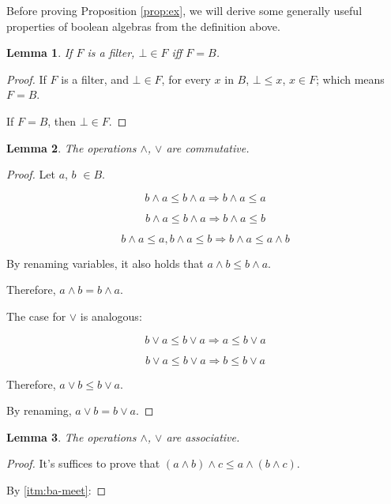 \documentclass[notitlepage,a4paper]{article}
\newtheorem{lemma}{Lemma}
\begin{document}
\begin{enumerate}
    Before proving Proposition \ref{prop:ex}, we will derive
    some generally useful properties of boolean algebras from the definition above.
    
     \begin{lemma}\label{lem:bot}
       If $F$ is a filter, $⊥ \in F$ iff $F = B$.
     \end{lemma}
     
     \begin{proof}
           If $F$ is a filter, and $⊥ ∈ F$, for every $x$ in $B$, $⊥ ≤ x$,
           $x ∈ F$; which means $F = B$.

           If $F = B$, then $⊥ \in F$.
     \end{proof}

      \begin{lemma}\label{lem:commutative}
       The operations $∧$, $∨$ are commutative.
     \end{lemma}

     \begin{proof}
       Let $a$, $b$ $∈ B$.
       
       $$b ∧ a ≤ b ∧ a \Rightarrow b ∧ a ≤ a$$

       $$b ∧ a ≤ b ∧ a \Rightarrow b ∧ a ≤ b$$
       
       $$b ∧ a ≤ a, b ∧ a ≤ b \Rightarrow b ∧ a ≤ a ∧ b$$

       By renaming variables,  it also holds that $a ∧ b ≤ b ∧ a$.

       Therefore, $a ∧ b = b ∧ a$.

       The case for $∨$ is analogous:

       $$b ∨ a ≤ b ∨ a \Rightarrow a ≤ b ∨ a$$
       
       $$b ∨ a ≤ b ∨ a \Rightarrow b ≤ b ∨ a$$

       Therefore, $a ∨ b ≤ b ∨ a$.

       By renaming, $a ∨ b = b ∨ a$.
       
     \end{proof}
       

     \begin{lemma}\label{lem:associative}
       The operations $∧$, $∨$ are associative.
     \end{lemma}

     \begin{proof}

       It's suffices to prove that $(a ∧ b) ∧ c ≤ a ∧ (b ∧ c)$.

       By \ref{itm:ba-meet}:


\end{proof}
\end{enumerate}
\end{document}
